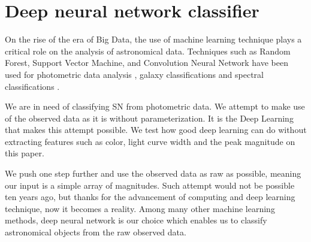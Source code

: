 \documentclass[proof]{pasj01}
\begin{document}
\section{Deep neural network classifier}
\label{sec:DNN}
On the rise of the era of Big Data, the use of machine learning technique plays a critical role on the analysis of astronomical data.  Techniques such as Random Forest, Support Vector Machine, and Convolution Neural Network have been used for photometric data analysis \citep{pasquet19a}, galaxy classifications \citep{hausen19a} and spectral 
classifications \citep{garciadias18a,muthukrishna19c,sharma20a}.

We are in need of classifying SN from photometric data.
We attempt to make use of the observed data as it is without parameterization.
It is the Deep Learning that makes this attempt possible.
We test how good deep learning can do without extracting features such as color, light curve width and the peak magnitude on this paper.

We push one step further and use the observed data as raw as possible, meaning our input is a simple array of magnitudes.  Such attempt would not be possible ten years ago, but thanks for the advancement of computing and deep learning technique, now it becomes a reality.  Among many other machine learning methods, deep neural network is our choice which enables us to classify astronomical objects from the raw observed data. 
\end{document}

